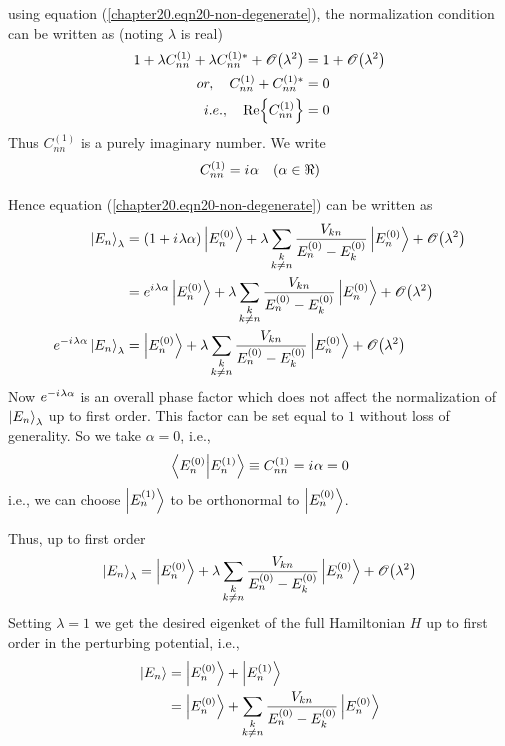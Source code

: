 	using equation (\ref{chapter20.eqn20-non-degenerate}), the normalization condition can be written as (noting $\lambda$ is real)
	\begin{align}
		1 + \lambda C^{(1)}_{n n} + \lambda C^{(1)*}_{n n} + \order{\lambda^2}
		&= 1 + \order{\lambda^2} \\
		or, \quad C^{(1)}_{n n} +  C^{(1)*}_{n n} &= 0  \\
	i.e., \quad		\Re{C^{(1)}_{n n}} &= 0
	\end{align}
	Thus $C^{(1)}_{n n}$ is a purely imaginary number. We write
	\begin{equation}
		C^{(1)}_{n n} = \iu \alpha \quad (\alpha \in \real)
	\end{equation}

	Hence equation (\ref{chapter20.eqn20-non-degenerate}) can be written as
	\begin{align}
		\ket{E_n}_{\lambda} 
		&= \qty(1 + \iu \lambda \alpha) \ket{E_n^{(0)}} + \lambda \sum_{\substack{k \\ k \neq n}} \frac{V_{k n}}{E_n^{(0)} -  E_{k}^{(0)}} \ket{E_n^{(0)}} + \order{\lambda^2} \\
		&= e^{\iu \lambda \alpha} \ket{E_n^{(0)}} + \lambda \sum_{\substack{k \\ k \neq n}} \frac{V_{k n}}{E_n^{(0)} -  E_{k}^{(0)}} \ket{E_n^{(0)}} + \order{\lambda^2} \\
		e^{-\iu \lambda \alpha} \ket{E_n}_{\lambda}  &= \ket{E_n^{(0)}} + \lambda \sum_{\substack{k \\ k \neq n}} \frac{V_{k n}}{E_n^{(0)} -  E_{k}^{(0)}} \ket{E_n^{(0)}} + \order{\lambda^2}
	\end{align}
	Now $e^{-{i\mkern1mu} \lambda \alpha}$ is an overall phase factor which does not affect the normalization of $\ket{E_n}_\lambda$ up to first order. This factor can be set equal to $1$ without loss of generality. So we take $\alpha = 0$, i.e.,
	\begin{equation}
		\braket{E^{(0)}_n}{E^{(1)}_n} \equiv C^{(1)}_{n n} = {i\mkern1mu} \alpha = 0
	\end{equation}
	i.e., we can choose $\ket{E_n^{(1)}}$ to be orthonormal to $\ket{E_n^{(0)}}$.
	
	Thus, up to first order
	\begin{equation}
		\ket{E_n}_{\lambda}  = \ket{E_n^{(0)}} + \lambda \sum_{\substack{k \\ k \neq n}} \frac{V_{k n}}{E_n^{(0)} -  E_{k}^{(0)}} \ket{E_n^{(0)}} + \order{\lambda^2}
	\end{equation}
	Setting $\lambda = 1$ we get the desired eigenket of  the full Hamiltonian $H$ up to first order in the perturbing potential, i.e.,
	\begin{align}
		\ket{E_n}  
		&= \ket{E_n^{(0)}} + \ket{E_n^{(1)}} \\
		&= \ket{E_n^{(0)}} +  \sum_{\substack{k \\ k \neq n}} \frac{V_{k n}}{E_n^{(0)} -  E_{k}^{(0)}} \ket{E_n^{(0)}}
		\label{chapter20.eqn21-non-degenerate}
	\end{align}
	

